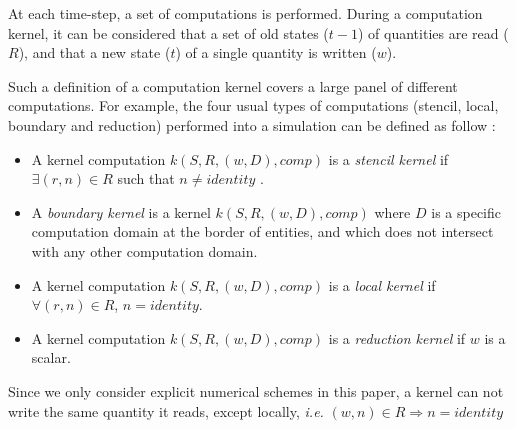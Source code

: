 At each time-step, a set of computations is performed. During a computation kernel, it can be considered that a set of old states ($t-1$) of quantities are read ($R$), and that a new state ($t$) of a single quantity is written ($w$).

Such a definition of a computation kernel covers a large panel of different computations. For example, the four usual types of computations (stencil, local, boundary and reduction) performed into a simulation can be defined as follow :
\begin{itemize}
\item A kernel computation $k(S,R,(w,D),comp)$ is a \emph{stencil kernel} if $\exists (r,n) \in R$ such that $n \neq identity$ .
\item A \emph{boundary kernel} is a kernel $k(S,R,(w,D),comp)$ where $D$ is a specific computation domain at the border of entities, and which does not intersect with any other computation domain.
\item A kernel computation $k(S,R,(w,D),comp)$ is a \emph{local kernel} if $\forall (r,n) \in R$, $n = identity$.
\item A kernel computation $k(S,R,(w,D),comp)$ is a \emph{reduction kernel} if $w$ is a scalar.%
\end{itemize}
Since we only consider explicit numerical schemes in this paper, a kernel can not write the same quantity it reads, except locally, \textit{i.e.} $(w,n) \in R\Rightarrow n=identity$



